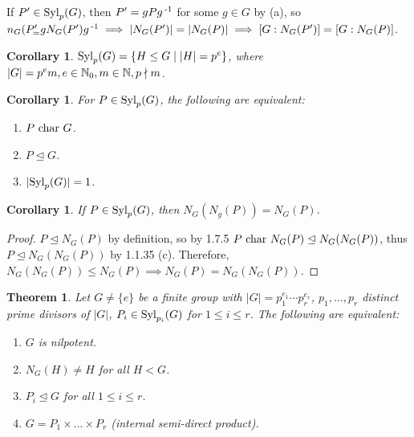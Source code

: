 \documentclass[11pt]{book}
\newcounter{counter}
\newtheorem{theorem}[counter]{Theorem}   \newtheorem*{theorem*}{Theorem}   \newtheorem{lemma}[counter]{Lemma}   \newtheorem{corollary}[counter]{Corollary}
\theoremstyle{definition}   \newtheorem{defn}[counter]{Definition} %
\newcommand{\nsg}{\mathrel{\unlhd}}   \newcommand{\ind}{\parindent24pt}   \newcommand{\vn}{\varnothing}
\newcommand{\vs}{\vspace{8pt}}
\numberwithin{counter}{chapter}
\begin{document}
\vs

\begin{remark*}
If $P' \in \textnormal{Syl}_p(G)$, then $P' = gPg\operatorname{^{-1}}$ for some $g \in G$ by (a), so $n_G(P'_ = gN_G(P')g\operatorname{^{-1}} \implies |N_G(P')| = |N_G(P)| \implies [G : N_G(P')] = [G : N_G(P)]$.
\end{remark*}

\vs

\begin{corollary}
$\textnormal{Syl}_p(G) = \{H \leq G \mid |H| = p^e\}$, where $|G| = p^em, e \in \operatorname{\mathbb{N}}_0, m\in \operatorname{\mathbb{N}},p \nmid m$.
\end{corollary}

\vs

\begin{corollary}
For $P \in \textnormal{Syl}_p(G)$, the following are equivalent:
\begin{enumerate}
\item[(i)] $P \textnormal{ char } G$.
\item[(ii)] $P \nsg G$.
\item[(iii)] $|\textnormal{Syl}_p(G)| = 1$.
\end{enumerate}
\end{corollary}

\vs

\begin{corollary}
If $P \in \textnormal{Syl}_p(G)$, then $N_G(N_g(P)) = N_G(P)$.
\end{corollary}

\begin{proof}
$P \nsg N_G(P)$ by definition, so by 1.7.5 $P \car N_G(P) \nsg N_G(N_G(P))$, thus $P \nsg N_G(N_G(P))$ by 1.1.35 (c). Therefore, $N_G(N_G(P)) \leq N_G(P) \implies N_G(P) = N_G(N_G(P))$.
\end{proof}

\vs

\begin{theorem}
Let $G \ne \{e\}$ be a finite group with $|G| = p_1^{e_1}\cdots p_r^{e_r}$, $p_1,\dots,p_r$ distinct prime divisors of $|G|$, $P_i \in \textnormal{Syl}_{p_i}(G)$ for $1 \leq i \leq r$. The following are equivalent:
\begin{enumerate}
\item[(i)] $G$ is nilpotent.
\item[(ii)] $N_G(H) \ne H$ for all $H < G$.
\item[(iii)] $P_i \nsg G$ for all $1 \leq i \leq r$.
\item[(iv)] $G = P_1 \times \dots \times P_r$ (internal semi-direct product).
\end{enumerate}
\end{theorem}
\end{document}
